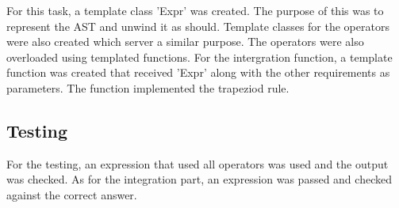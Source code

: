 \documentclass[a4paper, 12pt]{report}
\begin{document}
For this task, a template class  'Expr' was created. The purpose of this was to represent the AST and unwind it as should. Template classes for the operators were also created which server a similar purpose. The operators were also overloaded using templated functions.
\linebreak
For the intergration function, a template function was created that received 'Expr' along with the other requirements as parameters. The function implemented the trapeziod rule.

\subsection{Testing}

For the testing, an expression that used all operators was used and the output was checked. As for the integration part, an expression was passed and checked against the correct answer.
\end{document}
